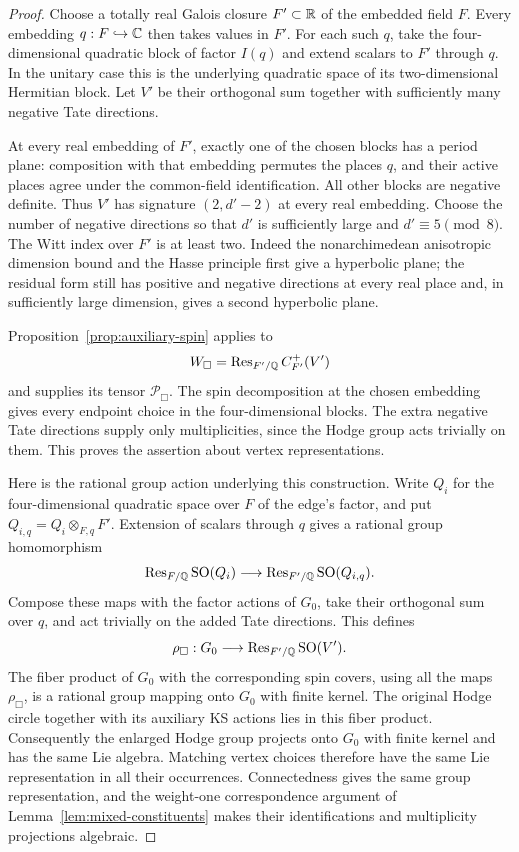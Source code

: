 \begin{proof}
Choose a totally real Galois closure $F'\subset\mathbb R$ of the embedded
field $F$.  Every embedding $q:F\hookrightarrow\mathbb C$ then takes values
in $F'$.  For each such $q$, take the four-dimensional quadratic block
of factor $I(q)$ and extend scalars to $F'$ through $q$.
In the unitary case this is the underlying
quadratic space of its two-dimensional Hermitian block.  Let $V'$ be
their orthogonal sum together with sufficiently many negative Tate
directions.

At every real embedding of $F'$, exactly one of the chosen blocks
has a period plane: composition with that embedding permutes the
places $q$, and their active places agree under the common-field
identification.  All other blocks are negative definite.  Thus $V'$
has signature $(2,d'-2)$ at every real embedding.  Choose the number
of negative directions so that $d'$ is sufficiently large and
$d'\equiv5\pmod8$.  The Witt index over $F'$ is at least two.
Indeed the nonarchimedean anisotropic dimension bound and the
Hasse principle first give a hyperbolic plane; the residual form
still has positive and negative directions at every real place and,
in sufficiently large dimension, gives a second hyperbolic plane.

Proposition~\ref{prop:auxiliary-spin} applies to
\[
 W_{\Box}=\operatorname{Res}_{F'/\mathbb Q}C^+_{F'}(V')
\]
and supplies its tensor $\mathcal P_{\Box}$.  The spin decomposition
at the chosen embedding gives every endpoint choice in the
four-dimensional blocks.  The extra negative Tate directions supply
only multiplicities, since the Hodge group acts trivially on them.
This proves the assertion about vertex representations.

Here is the rational group action underlying this construction.
Write $Q_i$ for the four-dimensional quadratic space over $F$ of
the edge's factor, and put $Q_{i,q}=Q_i\otimes_{F,q}F'$.  Extension
of scalars through $q$ gives a rational group homomorphism
\[
 \operatorname{Res}_{F/\mathbb Q}\mathrm{SO}(Q_i)
 \longrightarrow
 \operatorname{Res}_{F'/\mathbb Q}\mathrm{SO}(Q_{i,q}).
\]
Compose these maps with the factor actions of $G_0$, take their
orthogonal sum over $q$, and act trivially on the added Tate
directions.  This defines
\[
 \rho_{\Box}:G_0\longrightarrow
       \operatorname{Res}_{F'/\mathbb Q}\mathrm{SO}(V').
\]
The fiber product of $G_0$ with the corresponding spin covers,
using all the maps $\rho_{\Box}$, is a rational group mapping
onto $G_0$ with finite kernel.  The original Hodge circle together
with its auxiliary KS actions lies in this fiber product.
Consequently the enlarged Hodge group projects onto $G_0$ with
finite kernel and has the same Lie algebra.  Matching vertex
choices therefore have the same Lie representation in all their
occurrences.  Connectedness gives the same group representation,
and the weight-one correspondence argument of
Lemma~\ref{lem:mixed-constituents} makes their identifications and
multiplicity projections algebraic.
\end{proof}

